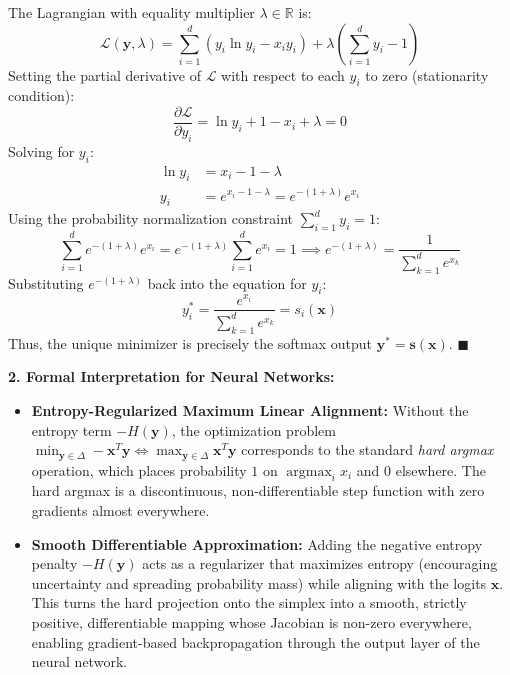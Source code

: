 \documentclass[11pt,english]{article}
\begin{document}
\begin{enumerate}
The Lagrangian with equality multiplier $\lambda \in \mathbb{R}$ is:
\begin{equation}
    \mathcal{L}(\mathbf{y}, \lambda) = \sum_{i=1}^d (y_i \ln y_i - x_i y_i) + \lambda \left(\sum_{i=1}^d y_i - 1\right)
\end{equation}
Setting the partial derivative of $\mathcal{L}$ with respect to each $y_i$ to zero (stationarity condition):
\begin{equation}
    \frac{\partial \mathcal{L}}{\partial y_i} = \ln y_i + 1 - x_i + \lambda = 0
\end{equation}
Solving for $y_i$:
\begin{align}
    \ln y_i &= x_i - 1 - \lambda \\
    y_i &= e^{x_i - 1 - \lambda} = e^{-(1+\lambda)} e^{x_i}
\end{align}
Using the probability normalization constraint $\sum_{i=1}^d y_i = 1$:
\begin{equation}
    \sum_{i=1}^d e^{-(1+\lambda)} e^{x_i} = e^{-(1+\lambda)} \sum_{i=1}^d e^{x_i} = 1 \implies e^{-(1+\lambda)} = \frac{1}{\sum_{k=1}^d e^{x_k}}
\end{equation}
Substituting $e^{-(1+\lambda)}$ back into the equation for $y_i$:
\begin{equation}
    y_i^* = \frac{e^{x_i}}{\sum_{k=1}^d e^{x_k}} = s_i(\mathbf{x})
\end{equation}
Thus, the unique minimizer is precisely the softmax output $\mathbf{y}^* = \mathbf{s}(\mathbf{x})$. $\blacksquare$

\vspace{0.5em}
\textbf{2. Formal Interpretation for Neural Networks:}
\begin{itemize}
    \item \textbf{Entropy-Regularized Maximum Linear Alignment:} Without the entropy term $-H(\mathbf{y})$, the optimization problem $\min_{\mathbf{y} \in \Delta} -\mathbf{x}^T \mathbf{y} \iff \max_{\mathbf{y} \in \Delta} \mathbf{x}^T \mathbf{y}$ corresponds to the standard \emph{hard argmax} operation, which places probability $1$ on $\operatorname{argmax}_i x_i$ and $0$ elsewhere. The hard argmax is a discontinuous, non-differentiable step function with zero gradients almost everywhere.
    \item \textbf{Smooth Differentiable Approximation:} Adding the negative entropy penalty $-H(\mathbf{y})$ acts as a regularizer that maximizes entropy (encouraging uncertainty and spreading probability mass) while aligning with the logits $\mathbf{x}$. This turns the hard projection onto the simplex into a smooth, strictly positive, differentiable mapping whose Jacobian is non-zero everywhere, enabling gradient-based backpropagation through the output layer of the neural network.
\end{itemize}

\end{enumerate}
\end{document}
